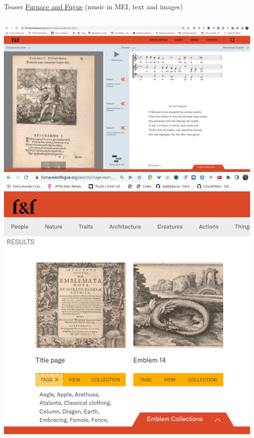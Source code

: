 \begin{frame}[allowframebreaks]{Teaser}
    \href{https://furnaceandfugue.org}{Furnace and Fugue} (music in MEI, text and images)
    \begin{columns}
    \includegraphics[width=\textwidth]{img/fnf1.png}
    \includegraphics[width=\textwidth]{img/fnf2.png}
    \end{columns}
    
    
\end{frame}


